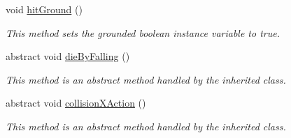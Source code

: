 \begin{DoxyCompactItemize}
\mbox{\label{classnl_1_1arjanfrans_1_1mario_1_1model_1_1MovingActor_a90b5fa37f912521b7f05f23765c5edbc}} 
void \hyperlink{classnl_1_1arjanfrans_1_1mario_1_1model_1_1MovingActor_a90b5fa37f912521b7f05f23765c5edbc}{hit\+Ground} ()
\begin{DoxyCompactList}\small\item\em This method sets the grounded boolean instance variable to true. \end{DoxyCompactList}\item 
\mbox{\label{classnl_1_1arjanfrans_1_1mario_1_1model_1_1MovingActor_ab7c880f8d5c44d9818ee0830357a06e5}} 
abstract void \hyperlink{classnl_1_1arjanfrans_1_1mario_1_1model_1_1MovingActor_ab7c880f8d5c44d9818ee0830357a06e5}{die\+By\+Falling} ()
\begin{DoxyCompactList}\small\item\em This method is an abstract method handled by the inherited class. \end{DoxyCompactList}\item 
\mbox{\label{classnl_1_1arjanfrans_1_1mario_1_1model_1_1MovingActor_ac227d16626526c50745efbe666594797}} 
abstract void \hyperlink{classnl_1_1arjanfrans_1_1mario_1_1model_1_1MovingActor_ac227d16626526c50745efbe666594797}{collision\+X\+Action} ()
\begin{DoxyCompactList}\small\item\em This method is an abstract method handled by the inherited class. \end{DoxyCompactList}\end{DoxyCompactItemize}
